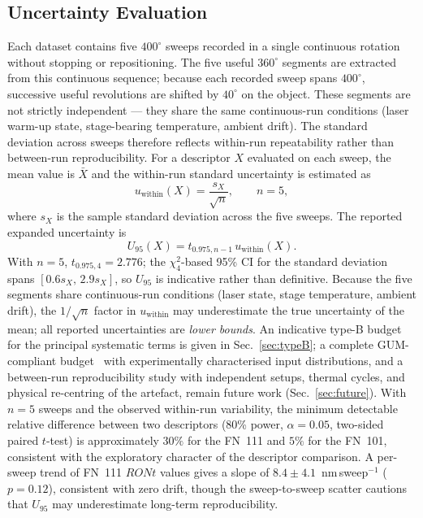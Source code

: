 \documentclass[review]{elsarticle}
\begin{document}
\subsection{Uncertainty Evaluation}
\label{sec:uncertainty}
Each dataset contains five $400^\circ$ sweeps recorded in a single continuous rotation without stopping or repositioning. The five useful $360^\circ$ segments are extracted from this continuous sequence; because each recorded sweep spans $400^\circ$, successive useful revolutions are shifted by $40^\circ$ on the object. These segments are not strictly independent — they share the same continuous-run conditions (laser warm-up state, stage-bearing temperature, ambient drift). The standard deviation across sweeps therefore reflects within-run repeatability rather than between-run reproducibility. For a descriptor $X$ evaluated on each sweep, the mean value is $\bar{X}$ and the within-run standard uncertainty is estimated as
\begin{equation}
u_{\mathrm{within}}(X)=\frac{s_X}{\sqrt{n}}, \qquad n=5,
\end{equation}
where $s_X$ is the sample standard deviation across the five sweeps. The reported expanded uncertainty is
\begin{equation}
U_{95}(X)=t_{0.975,n-1}\,u_{\mathrm{within}}(X).
\end{equation}
With $n=5$, $t_{0.975,4}=2.776$; the $\chi^2_4$-based 95\% CI for the standard deviation spans $[0.6s_X,\,2.9s_X]$, so $U_{95}$ is indicative rather than definitive. Because the five segments share continuous-run conditions (laser state, stage temperature, ambient drift), the $1/\sqrt{n}$ factor in $u_{\mathrm{within}}$ may underestimate the true uncertainty of the mean; all reported uncertainties are \emph{lower bounds}. An indicative type-B budget for the principal systematic terms is given in Sec.~\ref{sec:typeB}; a complete GUM-compliant budget~\cite{JCGM100} with experimentally characterised input distributions, and a between-run reproducibility study with independent setups, thermal cycles, and physical re-centring of the artefact, remain future work (Sec.~\ref{sec:future}). With $n=5$ sweeps and the observed within-run variability, the minimum detectable relative difference between two descriptors (80\% power, $\alpha=0.05$, two-sided paired $t$-test) is approximately $30\%$ for the FN~111 and $5\%$ for the FN~101, consistent with the exploratory character of the descriptor comparison. A per-sweep trend of FN~111 $RONt$ values gives a slope of $8.4\pm4.1$~nm\,sweep$^{-1}$ ($p=0.12$), consistent with zero drift, though the sweep-to-sweep scatter cautions that $U_{95}$ may underestimate long-term reproducibility.
\end{document}
